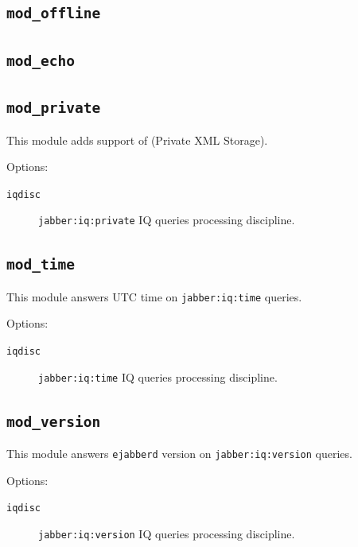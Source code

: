 \documentclass[10pt]{article}
\newcommand{\ns}[1]{\texttt{#1}}
\newcommand{\ejabberd}{\texttt{ejabberd}}
\newcommand{\modoffline}{\texttt{mod\_offline}}
\newcommand{\modecho}{\texttt{mod\_echo}}
\newcommand{\modprivate}{\texttt{mod\_private}}
\newcommand{\modtime}{\texttt{mod\_time}}
\newcommand{\modversion}{\texttt{mod\_version}}
\begin{document}
\subsection{\modoffline{}}
\label{sec:modoffline}



\subsection{\modecho{}}
\label{sec:modecho}



\subsection{\modprivate{}}
\label{sec:modprivate}

This module adds support of
 (Private XML
Storage).

Options:
\begin{description}
\item[\texttt{iqdisc}] \ns{jabber:iq:private} IQ queries processing discipline.
\end{description}

\subsection{\modtime{}}
\label{sec:modtime}

This module answers UTC time on \ns{jabber:iq:time} queries.

Options:
\begin{description}
\item[\texttt{iqdisc}] \ns{jabber:iq:time} IQ queries processing discipline.
\end{description}


\subsection{\modversion{}}
\label{sec:modversion}

This module answers \ejabberd{} version on \ns{jabber:iq:version} queries.

Options:
\begin{description}
\item[\texttt{iqdisc}] \ns{jabber:iq:version} IQ queries processing discipline.
\end{description}
\end{document}

